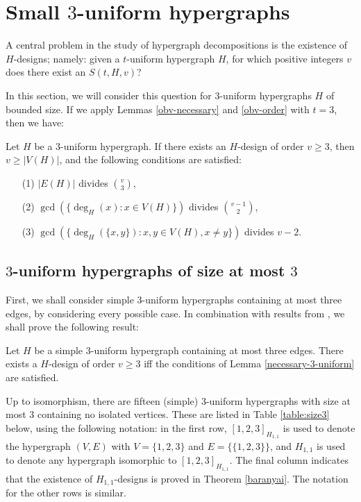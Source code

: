 \section{Small $3$-uniform hypergraphs}

A central problem in the study of hypergraph decompositions is the existence of
$H$-designs; namely: given a $t$-uniform hypergraph $H$, for which positive
integers $v$ does there exist an $S(t, H, v)$?

In this section, we will consider this question for $3$-uniform hypergraphs $H$ of bounded size.
If we apply Lemmas \ref{obv-necessary} and \ref{obv-order} with $t = 3$, then we have:

\begin{lemma} \label{necessary-3-uniform}
Let $H$ be a $3$-uniform hypergraph.
If there exists an $H$-design of order $v \geq 3$, then $v \geq |V(H)|$, and the following conditions are satisfied:
\begin{enumerate}
    \item[(1)] $|E(H)|$ divides ${v \choose 3}$,
    \item[(2)] $\gcd(\{\deg_H(x) : x \in V(H)\})$ divides ${v-1 \choose 2}$,
    \item[(3)] $\gcd(\{\deg_H(\{x,y\}) : x, y \in V(H), x \neq y\})$ divides $v-2$.
\end{enumerate}
\end{lemma}

\subsection{$3$-uniform hypergraphs of size at most $3$}

First, we shall consider simple $3$-uniform hypergraphs containing at most three edges, by considering every possible case.
In combination with results from \cite{baran, bryant, feng-chang2, hanani}, we shall prove the following result:

\begin{theorem}
Let $H$ be a simple $3$-uniform hypergraph containing at most three edges.
There exists a $H$-design of order $v \geq 3$ iff the conditions of Lemma \ref{necessary-3-uniform} are satisfied.
\end{theorem}

Up to isomorphism, there are fifteen (simple) $3$-uniform hypergraphs with size at most 3 containing no isolated vertices.
These are listed in Table \ref{table:size3} below, using the following notation: in the first row, $[1, 2, 3]_{H_{1,1}}$ is used to denote the hypergraph $(V, E)$ with $V = \{1, 2, 3\}$ and $E = \{\{1, 2, 3\}\}$, and $H_{1,1}$ is used to denote any hypergraph isomorphic to $[1, 2, 3]_{H_{1,1}}$.
The final column indicates that the existence of $H_{1,1}$-designs is proved in Theorem \ref{baranyai}.
The notation for the other rows is similar.


